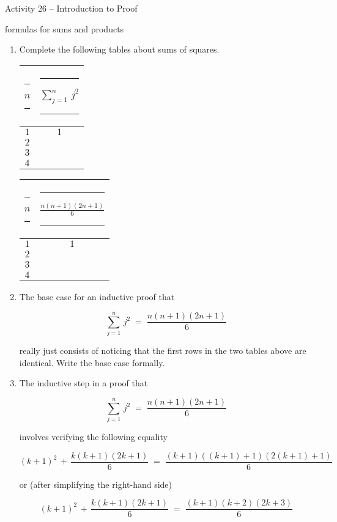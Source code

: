 \documentclass{amsart}
\newcommand{\hs}{\rule{18pt}{0pt}}
\newcommand{\vs}{\rule[-16pt]{0pt}{32pt}}
\begin{document}
\thispagestyle{empty}

\centerline{\Large Activity 26 -- Introduction to Proof}
\centerline{\large formulas for sums and products}

\bigskip
\Large


\begin{enumerate}
\item Complete the following tables about sums of squares.
\bigskip

\begin{tabular}{c|c}
\vs\hs $n$ \hs & \hs $\displaystyle \sum_{j=1}^n \, j^2$ \hs \\ \hline
\vs $1$ & $1$ \\
\vs $2$ & \\
\vs $3$ & \\
\vs $4$ & \\
\end{tabular}
\hspace{.5in}
\begin{tabular}{c|c}
\vs \hs $n$ \hs & \hs $\displaystyle \frac{n(n + 1)(2n + 1)}{6}$ \hs \\ \hline
\vs $1$ & $1$ \\
\vs $2$ & \\
\vs $3$ & \\
\vs $4$ & \\
\end{tabular}

\vspace{.3in}

\item The base case for an inductive proof that

\[ \sum_{j=1}^n \, j^2 \; = \; \frac{n(n + 1)(2n + 1)}{6}\]

really just consists of noticing that the first rows in the two tables
above are identical.  Write the base case formally.

\vfill

\newpage

\item The inductive step in a proof that

\[ \sum_{j=1}^n \, j^2 \; = \; \frac{n(n + 1)(2n + 1)}{6}\]

involves verifying the following equality

\[ (k + 1)^2 \, + \, \frac{k(k + 1)(2k + 1)}{6} \; = \; 
\frac{(k + 1)((k + 1) + 1)(2(k + 1) + 1)}{6}
\]

or (after simplifying the right-hand side)

\[ (k + 1)^2 \, + \, \frac{k(k + 1)(2k + 1)}{6} \; = \; 
\frac{(k + 1)(k + 2)(2k + 3)}{6}
\]


\end{enumerate}
\end{document}
